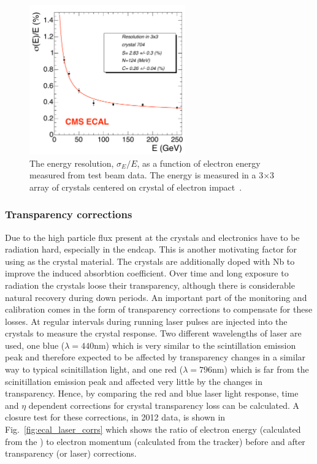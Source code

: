 \begin{figure}
  \includegraphics[width=0.6\textwidth]{ch2_cms_exp/plots/ecal_sigma_e_test_beam.pdf}
  \caption[ECAL energy resolution]{The \ECAL energy resolution, $\sigma_{E}/E$, as a function of electron energy measured from test beam data. The energy is measured in a 3$\times$3 array of crystals centered on crystal of electron impact~\cite{CMS_JINST}.}
  \label{fig:sigma_e_test_beam}
\end{figure}

\subsubsection{Transparency corrections}

Due to the high particle flux present at \CMS the \ECAL crystals and electronics have to be radiation hard, especially in the endcap. This is another motivating factor for using \PbWO as the crystal material. The crystals are additionally doped with Nb to improve the induced absorbtion coefficient. Over time and long exposure to radiation the crystals loose their transparency, although there is considerable natural recovery during down periods. An important part of the \ECAL monitoring and calibration comes in the form of transparency corrections to compensate for these losses. At regular intervals during \LHC running laser pulses are injected into the crystals to measure the crystal response. Two different wavelengths of laser are used, one blue ($\lambda=440$nm) which is very similar to the scintillation emission peak and therefore expected to be affected by transparency changes in a similar way to typical scinitillation light, and one red ($\lambda=796$nm) which is far from the scinitillation emission peak and affected very little by the changes in transparency. Hence, by comparing the red and blue laser light response, time and $\eta$ dependent corrections for crystal transparency loss can be calculated. A closure test for these corrections, in 2012 data, is shown in Fig.~\ref{fig:ecal_laser_corrs} which shows the ratio of electron energy (calculated from the \ECAL) to electron momentum (calculated from the tracker) before and after transparency (or laser) corrections. 


